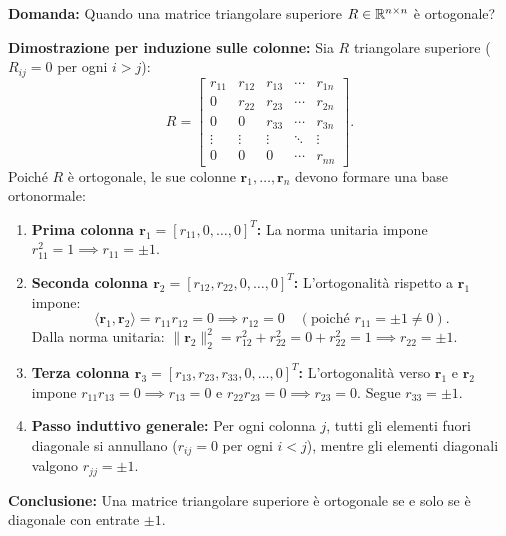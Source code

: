 \begin{example}
\textbf{Domanda:} Quando una matrice triangolare superiore $R \in \mathbb{R}^{n \times n}$ \`e ortogonale?

\textbf{Dimostrazione per induzione sulle colonne:} Sia $R$ triangolare superiore ($R_{ij} = 0$ per ogni $i > j$):
\begin{equation}
    R = \begin{bmatrix}
        r_{11} & r_{12} & r_{13} & \cdots & r_{1n} \\
        0 & r_{22} & r_{23} & \cdots & r_{2n} \\
        0 & 0 & r_{33} & \cdots & r_{3n} \\
        \vdots & \vdots & \vdots & \ddots & \vdots \\
        0 & 0 & 0 & \cdots & r_{nn}
    \end{bmatrix}.
\end{equation}
Poich\'e $R$ \`e ortogonale, le sue colonne $\mathbf{r}_1, \dots, \mathbf{r}_n$ devono formare una base ortonormale:
\begin{enumerate}
    \item \textbf{Prima colonna $\mathbf{r}_1 = [r_{11}, 0, \dots, 0]^T$:}
    La norma unitaria impone $r_{11}^2 = 1 \implies r_{11} = \pm 1$.
    \item \textbf{Seconda colonna $\mathbf{r}_2 = [r_{12}, r_{22}, 0, \dots, 0]^T$:}
    L'ortogonalit\`a rispetto a $\mathbf{r}_1$ impone:
    \begin{equation}
        \langle \mathbf{r}_1, \mathbf{r}_2 \rangle = r_{11} r_{12} = 0 \implies r_{12} = 0 \quad (\text{poich\'e } r_{11} = \pm 1 \neq 0).
    \end{equation}
    Dalla norma unitaria: $\|\mathbf{r}_2\|_2^2 = r_{12}^2 + r_{22}^2 = 0 + r_{22}^2 = 1 \implies r_{22} = \pm 1$.
    \item \textbf{Terza colonna $\mathbf{r}_3 = [r_{13}, r_{23}, r_{33}, 0, \dots, 0]^T$:}
    L'ortogonalit\`a verso $\mathbf{r}_1$ e $\mathbf{r}_2$ impone $r_{11} r_{13} = 0 \implies r_{13} = 0$ e $r_{22} r_{23} = 0 \implies r_{23} = 0$. Segue $r_{33} = \pm 1$.
    \item \textbf{Passo induttivo generale:} Per ogni colonna $j$, tutti gli elementi fuori diagonale si annullano ($r_{ij} = 0$ per ogni $i < j$), mentre gli elementi diagonali valgono $r_{jj} = \pm 1$.
\end{enumerate}
\textbf{Conclusione:} Una matrice triangolare superiore \`e ortogonale se e solo se \`e diagonale con entrate $\pm 1$.
\end{example}


